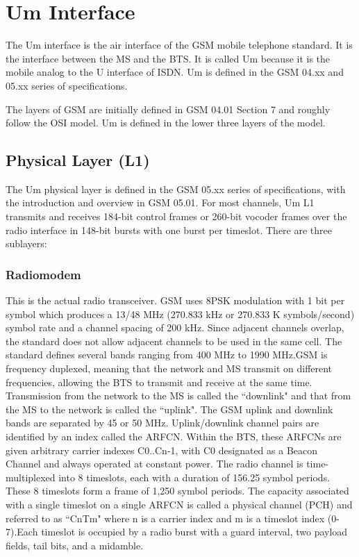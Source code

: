 \section{Um Interface}
The Um interface is the air interface of the GSM mobile telephone standard.
It is the interface between the MS and the BTS. It is called Um because it
is the mobile analog to the U interface of ISDN. Um is defined in the
GSM 04.xx and 05.xx series of specifications.


The layers of GSM are initially defined in GSM 04.01 Section 7 and roughly
follow the OSI model. Um is defined in the lower three layers of the model.

\subsection{Physical Layer (L1)}
The Um physical layer is defined in the GSM 05.xx series of specifications,
 with the introduction and overview in GSM 05.01. For most channels,
Um L1 transmits and receives 184-bit control frames or 260-bit vocoder
frames over the radio interface in 148-bit bursts with one burst per
timeslot. There are three sublayers:

\subsubsection*{Radiomodem}
 
This is the actual radio transceiver. GSM uses 8PSK modulation with 1 bit per
symbol which produces a 13/48 MHz (270.833 kHz or 270.833 K symbols/second)
symbol rate and a channel spacing of 200 kHz. Since adjacent channels overlap,
the standard does not allow adjacent channels to be used in the same cell. The
standard defines several bands ranging from 400 MHz to 1990 MHz.GSM is frequency
 duplexed, meaning that the network and MS transmit on different frequencies,
allowing the BTS to transmit and receive at the same time. Transmission from
the network to the MS is called the ``downlink" and that from the MS to the network
is called the ``uplink". The GSM uplink and downlink bands are separated by 45 or
50 MHz. Uplink/downlink channel pairs are identified by an index called the
ARFCN. Within the BTS, these ARFCNs are given arbitrary carrier indexes
C0..Cn-1, with C0 designated as a Beacon Channel and always operated at constant
 power. The radio channel is time-multiplexed into 8 timeslots, each with a
duration of 156.25 symbol periods. These 8 timeslots form a frame of 1,250
symbol periods. The capacity associated with a single timeslot on a single
ARFCN is called a physical channel (PCH) and referred to as ``CnTm" where n is
a carrier index and m is a timeslot index (0-7).Each timeslot is occupied by
a radio burst with a guard interval, two payload fields, tail bits, and a
midamble.


